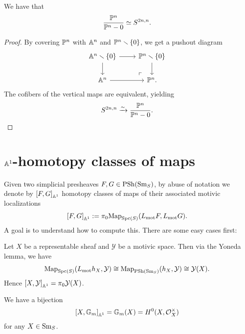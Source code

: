 \documentclass[11pt,openany]{book}
\renewcommand{\Pre}{\mathrm{PSh}}
\begin{document}
\begin{proposition} We have that
\begin{align*}
    \frac{\P^n}{\P^n-0}\simeq S^{2n,n}.
\end{align*}
\end{proposition}
\begin{proof} By covering $\P^n$ with $\A^n$ and $\P^n\minus\left\{ 0 \right\}$, we get a pushout diagram
\[ \begin{tikzcd}
    \A^n\minus \left\{ 0 \right\}\rar\dar & \P^n\minus\left\{ 0 \right\}\dar\\
    \A^n\rar & \P^n.\po
\end{tikzcd} \]
The cofibers of the vertical maps are equivalent, yielding
\begin{align*}
    S^{2n,n} \xto{\sim} \frac{\P^n}{\P^n-0}.
\end{align*}
\end{proof}



\section{\texorpdfstring{$\A^1$}{A\^{}1}-homotopy classes of maps}

Given two simplicial presheaves $F,G \in \PSh(\Sm_S)$, by abuse of notation we denote by $\left[ F,G \right]_{\A^1}$ homotopy classes of maps of their associated motivic localizations
\begin{align*}
    \left[ F,G \right]_{\A^1} := \pi_0 \Map_{\Spc(S)} (L_\mot F, L_\mot G).
\end{align*}
%
A goal is to understand how to compute this. There are some easy cases first:

\begin{example} Let $X$ be a representable sheaf and $\mathcal{Y}$ be a motivic space. Then via the Yoneda lemma, we have
\begin{align*}
    \Map_{\Spc(S)}(L_\mot h_X, \mathcal{Y}) \cong \Map_{\Pre(\Sm_S)} (h_X, \mathcal{Y}) \cong \mathcal{Y}(X).
\end{align*}
Hence $\left[ X,\mathcal{Y} \right]_{\A^1} = \pi_0 \mathcal{Y}(X)$.
\end{example}

\begin{example} We have a bijection
\begin{align*}
    \left[ X, \mathbb{G}_m \right]_{\A^1} = \mathbb{G}_m(X) = H^0(X,\mathcal{O}_X^\times)
\end{align*}
for any $X\in \Sm_S$.
\end{example}
\end{document}
